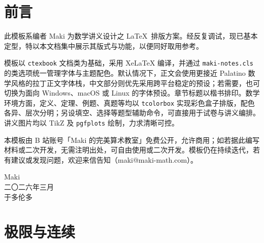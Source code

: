 \documentclass[a4paper,12pt,oneside]{maki-notes}
\begin{document}
	
	\frontmatter
	
	\MakeTitlePage
	
	
	
	\chapter*{前言}
	此模板系编者 Maki 为数学讲义设计之 \LaTeX\ 排版方案。经反复调试，现已基本定型，特以本文档集中展示其版式与功能，以便同好取用参考。
	
	模板以 \texttt{ctexbook} 文档类为基础，采用 XeLaTeX 编译，并通过 \texttt{maki-notes.cls} 的类选项统一管理字体与主题配色。默认情况下，正文会使用更接近 Palatino 数学风格的拉丁正文字体栈，中文部分则优先采用跨平台稳定的预设；若需要，也可切换为面向 Windows、macOS 或 Linux 的字体预设。章节标题以楷书排印。数学环境方面，定义、定理、例题、真题等均以 \texttt{tcolorbox} 实现彩色盒子排版，配色各异、层次分明；另设填空、选择等题型辅助命令，可直接用于试卷与讲义编排。讲义图片均以 TikZ 及 \texttt{pgfplots} 绘制，力求清晰可控。
	
	本模板由 B 站账号「Maki 的完美算术教室」免费公开，允许商用；如若据此编写材料或二次开发，无需注明出处，可自由使用或二次开发。模板仍在持续迭代，若有建议或发现问题，欢迎来信告知（maki@maki-math.com）。
	
	\vspace{3cm}
	
	\hfill
	\begin{minipage}{5cm}
		\centering
		Maki \\
		二〇二六年三月\\
		于多伦多
	\end{minipage}
	
	
	
	
	\tableofcontents
	
	
	\mainmatter
	
	
	
	
	
	
	
	
	\chapter{极限与连续}
	
\end{document}
